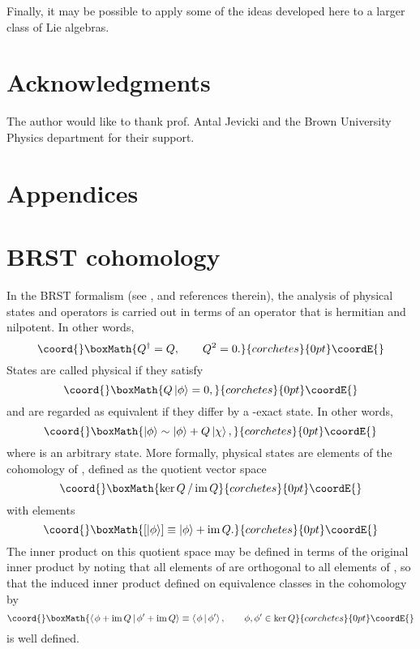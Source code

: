 \documentclass[a4paper,dvips,12pt]{article}
\providecommand {\ket}[1] {\left| #1 \right>}
\providecommand {\braket}[2] {\left< { \left. #1 \,\right|} \,#2 \right>}
\providecommand {\im} {\mathrm{im}\,}
\begin{document}
    Finally, it may be possible to apply some of the ideas developed
    here to a larger class of Lie algebras.

    \section*{Acknowledgments}

    The author would like to thank prof. Antal Jevicki and the Brown
    University Physics department for their support.

    \section*{Appendices}
    \appendix

    \section{BRST cohomology}
    \label{BRST}

    In the BRST formalism (see \cite{BRST}, \cite{HENNEAUX} and references therein),
    the analysis of physical states and
    operators is carried out in terms of an operator \coordHE{} that is hermitian
    and nilpotent.  In other words,
    \[\coord{}\boxMath{
        Q^\dagger = Q, \qquad Q^2 = 0.
    }{corchetes}{0pt}\coordE{}\]
    States are called physical if they satisfy
    \[\coord{}\boxMath{
        Q\ket{\phi} = 0,
    }{corchetes}{0pt}\coordE{}\]
    and are regarded as equivalent if they differ by a \coordHE{}-exact
    state. In other words,
    \[\coord{}\boxMath{
        \ket{\phi} \sim \ket{\phi} + Q \ket{\chi},
    }{corchetes}{0pt}\coordE{}\]
    where \myHighlight{$\ket{\chi}$}\coordHE{} is an arbitrary state.
    More formally, physical states are elements of the
    cohomology of \coordHE{}, defined as the quotient vector space
    \[\coord{}\boxMath{
        {\ker Q\, / \,\im Q}
    }{corchetes}{0pt}\coordE{}\]
    with elements
    \[\coord{}\boxMath{
        [\ket{\phi}] \equiv \ket{\phi} + \im Q.
    }{corchetes}{0pt}\coordE{}\]
    The inner product on this quotient space may be defined in
    terms of the original inner product by
    noting that all elements of \myHighlight{$\im Q$}\coordHE{} are orthogonal to all
    elements of \coordHE{}, so that the induced inner product
    defined on equivalence classes in the cohomology by
    \[\coord{}\boxMath{
        \braket {\phi + \im Q}{\phi' + \im Q} \equiv
        \braket{\phi}{\phi'}, \qquad \phi, \phi' \in \ker Q
    }{corchetes}{0pt}\coordE{}\]
    is well defined.
\end{document}
